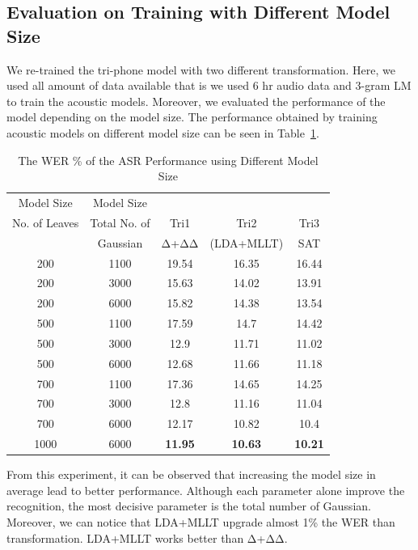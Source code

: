 \documentclass[conference]{IEEEtran}
\begin{document}
\subsection{Evaluation on Training with Different Model Size}
\label{sec:EvaluationDiffMS}
We re-trained the tri-phone model with two different transformation. Here, we used all amount of data available that is we used 6 hr audio data and 3-gram LM to train the acoustic models. Moreover, we evaluated the performance of the model depending on the model size. The performance obtained by training acoustic models on different model size can be seen in Table~\ref{table:diffMSData}.
\begin{table}[ht]
\caption{The WER \% of the ASR Performance using Different Model Size} %
\centering %
\setlength\tabcolsep{1.5pt} %
\begin{tabular}{c c c c c} %
\hline %
 Model Size & Model Size &  &  &   \\
No. of Leaves & Total No. of & Tri1 & Tri2 & Tri3 \\  %
  & Gaussian & Δ+ΔΔ & (LDA+MLLT) & SAT  \\
\hline %
200 & 1100 & 19.54 & 16.35 & 16.44\\
200 & 3000 & 15.63 & 14.02 & 13.91\\
200 & 6000 & 15.82 & 14.38 & 13.54\\
500 & 1100 & 17.59 & 14.7 & 14.42\\
500 & 3000 & 12.9 & 11.71 & 11.02\\
500 & 6000 & 12.68 & 11.66 & 11.18\\
700 & 1100 & 17.36 & 14.65 & 14.25\\
700 & 3000 & 12.8 & 11.16 & 11.04\\
700 & 6000 & 12.17 & 10.82 & 10.4\\
1000 & 6000 & \textbf{11.95} & \textbf{10.63} & \textbf{10.21}\\[1ex] %
\hline %
\end{tabular}
\label{table:diffMSData} %
\end{table}

From this experiment, it can be observed that increasing the model size in average lead to better performance. Although each parameter alone improve the recognition, the most decisive parameter is the total number of Gaussian. Moreover, we can notice that LDA+MLLT upgrade almost 1\% the WER than transformation. LDA+MLLT works better than Δ+ΔΔ. 
\end{document}
